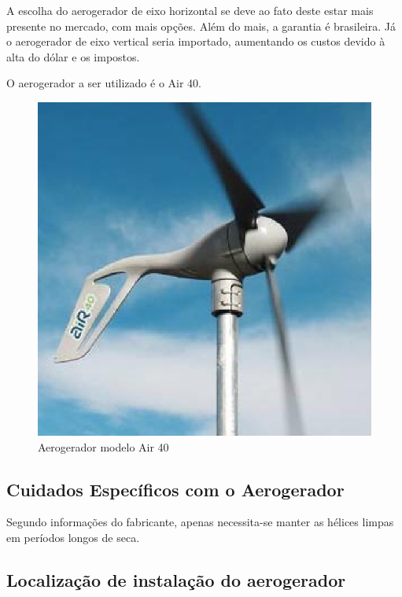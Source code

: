 	A escolha do aerogerador de eixo horizontal se deve ao fato deste estar mais presente no mercado, com mais opções. Além do mais, a garantia é brasileira. Já o aerogerador de eixo vertical seria importado, aumentando os custos devido à alta do dólar e os impostos.

	O aerogerador a ser utilizado é o Air 40.

\begin{figure}[H]
  \begin{center}
	\includegraphics[keepaspectratio,scale=0.5]{figuras/air_40.eps}
	\caption{Aerogerador modelo Air 40}
  \end{center}
\end{figure}


\subsection{Cuidados Específicos com o Aerogerador}

	Segundo informações do fabricante, apenas necessita-se manter as hélices limpas em períodos longos de seca.

\subsection{Localização de instalação do aerogerador}

